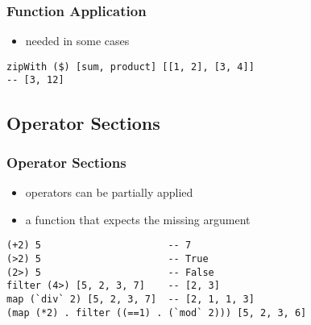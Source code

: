 \documentclass[dvipsnames]{beamer}
\theoremstyle{plain}
\begin{document}
\begin{frame}[fragile]
  \frametitle{Function Application}

  \begin{itemize}
    \item needed in some cases
  \end{itemize}

  \begin{exampleblock}{}
    \begin{lstlisting}
zipWith ($) [sum, product] [[1, 2], [3, 4]]
-- [3, 12]
    \end{lstlisting}
  \end{exampleblock}
\end{frame}

\subsection{Operator Sections}

\begin{frame}[fragile]
  \frametitle{Operator Sections}

  \begin{itemize}
    \item operators can be partially applied
    \item a function that expects the missing argument
  \end{itemize}

  \begin{exampleblock}{}
    \begin{lstlisting}
(+2) 5                      -- 7
(>2) 5                      -- True
(2>) 5                      -- False
filter (4>) [5, 2, 3, 7]    -- [2, 3]
map (`div` 2) [5, 2, 3, 7]  -- [2, 1, 1, 3]
(map (*2) . filter ((==1) . (`mod` 2))) [5, 2, 3, 6]
    \end{lstlisting}
  \end{exampleblock}
\end{frame}


%
%
%
\end{document}
